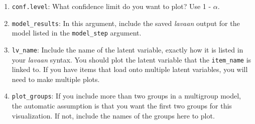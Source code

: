 \documentclass[
  man,floatsintext]{apa7}
\newenvironment{Shaded}{\begin{snugshade}}{\end{snugshade}}
\newcommand{\AttributeTok}[1]{\textcolor[rgb]{0.13,0.29,0.53}{#1}}
\newcommand{\CommentTok}[1]{\textcolor[rgb]{0.56,0.35,0.01}{\textit{#1}}}
\newcommand{\DecValTok}[1]{\textcolor[rgb]{0.00,0.00,0.81}{#1}}
\newcommand{\FunctionTok}[1]{\textcolor[rgb]{0.13,0.29,0.53}{\textbf{#1}}}
\newcommand{\NormalTok}[1]{#1}
\newcommand{\OtherTok}[1]{\textcolor[rgb]{0.56,0.35,0.01}{#1}}
\newcommand{\SpecialCharTok}[1]{\textcolor[rgb]{0.81,0.36,0.00}{\textbf{#1}}}
\newcommand{\StringTok}[1]{\textcolor[rgb]{0.31,0.60,0.02}{#1}}
\begin{document}
\begin{enumerate}
\item
  \texttt{conf.level}: What confidence limit do you want to plot? Use 1 - \(\alpha\).
\item
  \texttt{model\_results}: In this argument, include the saved \emph{lavaan} output for the model listed in the \texttt{model\_step} argument.
\item
  \texttt{lv\_name}: Include the name of the latent variable, exactly how it is listed in your \emph{lavaan} syntax. You should plot the latent variable that the \texttt{item\_name} is linked to. If you have items that load onto multiple latent variables, you will need to make multiple plots.
\item
  \texttt{plot\_groups}: If you include more than two groups in a multigroup model, the automatic assumption is that you want the first two groups for this visualization. If not, include the names of the groups here to plot.
\end{enumerate}

\small

\begin{Shaded}
\end{Shaded}
\end{document}
